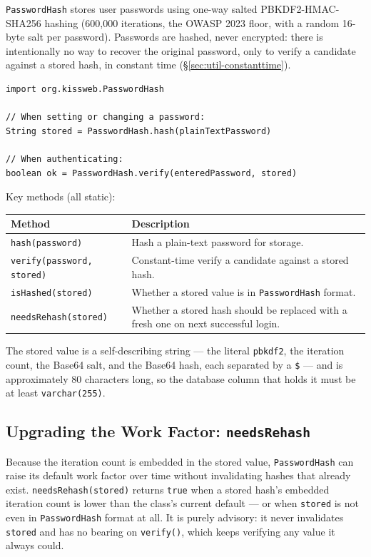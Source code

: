 \texttt{PasswordHash} stores user passwords using one-way salted PBKDF2-HMAC-SHA256 hashing (600,000 iterations, the OWASP 2023 floor, with a random 16-byte salt per password).  Passwords are hashed, never encrypted: there is intentionally no way to recover the original password, only to verify a candidate against a stored hash, in constant time (\S\ref{sec:util-constanttime}).

\begin{lstlisting}[style=groovy]
import org.kissweb.PasswordHash

// When setting or changing a password:
String stored = PasswordHash.hash(plainTextPassword)

// When authenticating:
boolean ok = PasswordHash.verify(enteredPassword, stored)
\end{lstlisting}

\noindent
Key methods (all static):

\begin{longtable}{P{4.8cm}P{5.7cm}}
\toprule
\textbf{Method} & \textbf{Description} \\
\midrule
\endhead
\texttt{hash(password)} & Hash a plain-text password for storage. \\
\texttt{verify(password, stored)} & Constant-time verify a candidate against a stored hash. \\
\texttt{isHashed(stored)} & Whether a stored value is in \texttt{PasswordHash} format. \\
\texttt{needsRehash(stored)} & Whether a stored hash should be replaced with a fresh one on next successful login. \\
\bottomrule
\end{longtable}

\noindent
The stored value is a self-describing string --- the literal \texttt{pbkdf2}, the iteration count, the Base64 salt, and the Base64 hash, each separated by a \texttt{\$} --- and is approximately 80 characters long, so the database column that holds it must be at least \texttt{varchar(255)}.

\subsection{Upgrading the Work Factor: \texttt{needsRehash}}

Because the iteration count is embedded in the stored value, \texttt{PasswordHash} can raise its default work factor over time without invalidating hashes that already exist.  \texttt{needsRehash(stored)} returns \texttt{true} when a stored hash's embedded iteration count is lower than the class's current default --- or when \texttt{stored} is not even in \texttt{PasswordHash} format at all.  It is purely advisory: it never invalidates \texttt{stored} and has no bearing on \texttt{verify()}, which keeps verifying any value it always could.

